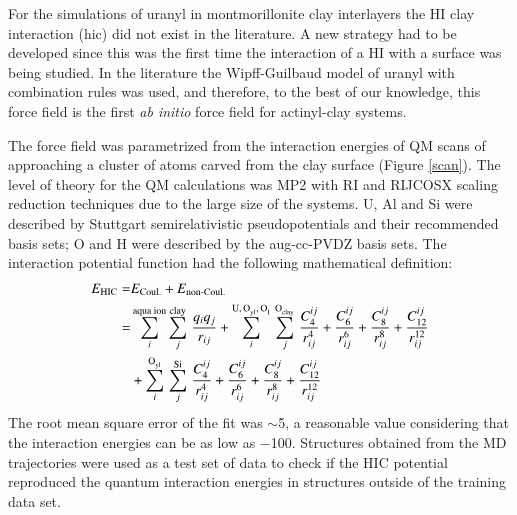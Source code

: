 For the simulations of uranyl in montmorillonite clay interlayers the HI clay interaction (\gls{hic}) 
did not exist in the literature. A new strategy had to be developed since this was the first time 
the interaction of a HI with a surface was being studied. In the 
literature\cite{PhysChemChemPhys_Greathouse_2005,EnviSciTech_Greathouse_2006,JHazMat_Yang_2013,
JHazMat_Liu_2013,MolSim_Cygan_2014,
InorChemFronteirs_Zhang_2015,ClayMinSoc_Zaidan_2003,ClayMinSoc_Greathouse_2005} the 
Wipff-Guilbaud model of uranyl with combination rules was used, and therefore, to the best of 
our 
knowledge, this force field is the 
first \textit{ab initio} force field for actinyl-clay systems.


The force field was parametrized from 
the interaction energies of QM scans of  approaching a
cluster of atoms carved from the clay surface (Figure \ref{scan}). The level of theory for the QM 
calculations was MP2 with 
RI\cite{RI1_Dunlap_JChemPhys_1979,RI2_JCompChem_Alsenoy_1988,RI3_Kendall_TheoChemAcc_1997,
RI4_Ahlrich_ChemPhysLett_1995,RI5_Ahlrich_TheoChemAcc_1997} and 
RIJCOSX\cite{RIJCOSX_ChemPhys_Nesse_2009} scaling reduction techniques due to the large size of the 
systems. U, Al and Si were described by Stuttgart semirelativistic pseudopotentials and their 
recommended 
basis sets\cite{U_ecpbasis,H-Rn_ECPbasis_PhysChemChemPhys_Ahlrichs_2005}; O and H were described by 
the 
aug-cc-PVDZ basis 
sets\cite{DunningBasisSet1_Dunning_JChemPhys_1989,DunningBasisSet2_Dunning_JChemPhys_1994,
DunningBasisSet3_Dunning_JChemPhys_1993,
DunningBasisSet4_Dunning_JChemPhys_1992,DunningBasisSet5_Dunning_JChemPhys_1996}. The interaction 
potential function had the following mathematical definition: 
 \begin{align} \label{eq_EHIC}
 E_\text{HIC}=& E_{\text{Coul.}}+E_{\text{non-Coul.}} \\ \nonumber
=&\sum_{i}^{\text{aqua ion}}\sum_{j}^{\text{clay}}\,\frac{q_iq_j}{r_{ij}}
+\sum_{i}^{\ce{U},\,\ce{O_{yl}},\,\ce{O_{I}}}\,\sum_{j}^{\ce{O_{clay}}}\,\frac{C_4^{ij}}{r^4_{ij}
} +
 \frac{C_6^{ij}}{r^6_{ij}}+\frac{C_8^{ij}}{r^8_{ij}}+\frac{C_{12}^{ij}}{r^{12}_{ij}} \nonumber
 \\&+\sum_{i}^{\ce{O_{yl}}}\,\sum_{j}^{\ce{Si}}\,\frac{C_4^{ij}}{r^4_{ij}}+
 \frac{C_6^{ij}}{r^6_{ij}}+\frac{C_8^{ij}}{r^8_{ij}}+\frac{C_{12}^{ij}}{r^{12}_{ij}} \nonumber
\end{align}
The root mean square error of the fit was $\sim$\SI{5}{\kcalmol}, a reasonable value
considering that the interaction energies can be as low as \SI{-100}{\kcalmol}. Structures 
obtained from the MD trajectories were used as a test set of data to check if the 
HIC potential reproduced the quantum interaction energies in structures outside of the 
training data set. 

